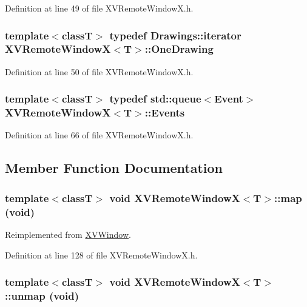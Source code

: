 Definition at line 49 of file XVRemote\-Window\-X.h.\label{XVRemoteWindowX_t1}
\hypertarget{class_XVRemoteWindowX_t1}{
\subsubsection[OneDrawing]{\setlength{\rightskip}{0pt plus 5cm}template$<$classT$>$ typedef Drawings::iterator XVRemote\-Window\-X$<$T$>$::One\-Drawing}}




Definition at line 50 of file XVRemote\-Window\-X.h.\label{XVRemoteWindowX_t2}
\hypertarget{class_XVRemoteWindowX_t2}{
\subsubsection[Events]{\setlength{\rightskip}{0pt plus 5cm}template$<$classT$>$ typedef std::queue$<$Event$>$ XVRemote\-Window\-X$<$T$>$::Events}}




Definition at line 66 of file XVRemote\-Window\-X.h.

\subsection{Member Function Documentation}
\label{XVRemoteWindowX_a6}
\hypertarget{class_XVRemoteWindowX_a6}{
\subsubsection[map]{\setlength{\rightskip}{0pt plus 5cm}template$<$classT$>$ void XVRemote\-Window\-X$<$T$>$::map (void)}}




Reimplemented from \hyperlink{class_XVWindow}{XVWindow}.

Definition at line 128 of file XVRemote\-Window\-X.h.\label{XVRemoteWindowX_a7}
\hypertarget{class_XVRemoteWindowX_a7}{
\subsubsection[unmap]{\setlength{\rightskip}{0pt plus 5cm}template$<$classT$>$ void XVRemote\-Window\-X$<$T$>$::unmap (void)}}




